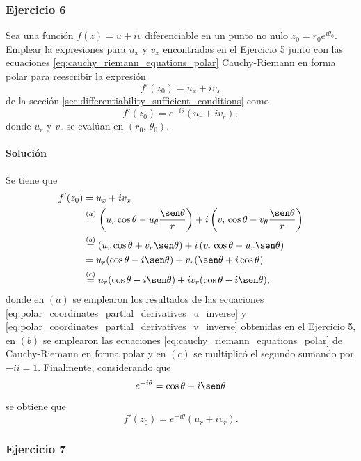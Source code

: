 \documentclass[a4paper]{report}
\begin{document}
\subsubsection{Ejercicio 6}

Sea una función \(f(z)=u+iv\) diferenciable en un punto no nulo \(z_0=r_0e^{i\theta_0}\). Emplear la expresiones para \(u_x\) y \(v_x\) encontradas en el Ejercicio 5 junto con las ecuaciones \ref{eq:cauchy_riemann_equations_polar} Cauchy-Riemann en forma polar para reescribir la expresión 
\[
 f'(z_0)=u_x+iv_x
\]
de la sección \ref{sec:differentiability_sufficient_conditions} como
\begin{equation}\label{eq:cauchy_riemann_f_derivative_polar}
 f'(z_0)=e^{-i\theta}(u_r+iv_r),
\end{equation}
donde \(u_r\) y \(v_r\) se evalúan en \((r_0,\,\theta_0)\).

\paragraph{Solución} Se tiene que 
\begin{align}
 f'(z_0)&=u_x+iv_x\nonumber\\
  &\overset{(a)}{=}\left(u_r\cos\theta-u_\theta\frac{\sen\theta}{r}\right)+i\left(v_r\cos\theta-v_\theta\frac{\sen\theta}{r}\right)\label{eq:exercise_24_06_f_derivative}\\
  &\overset{(b)}{=}\left(u_r\cos\theta+v_r\sen\theta\right)+i\left(v_r\cos\theta-u_r\sen\theta\right)\nonumber\\
  &=u_r(\cos\theta-i\sen\theta)+v_r(\sen\theta+i\cos\theta)\nonumber\\
  &\overset{(c)}{=}u_r(\cos\theta-i\sen\theta)+iv_r(\cos\theta-i\sen\theta),\nonumber
\end{align}
donde en \((a)\) se emplearon los resultados de las ecuaciones \ref{eq:polar_coordinates_partial_derivatives_u_inverse} y \ref{eq:polar_coordinates_partial_derivatives_v_inverse} obtenidas en el Ejercicio 5, en \((b)\) se emplearon las ecuaciones \ref{eq:cauchy_riemann_equations_polar} de Cauchy-Riemann en forma polar y en \((c)\) se multiplicó el segundo sumando por \(-ii=1\). Finalmente, considerando que 
\[
 e^{-i\theta}=\cos\theta-i\sen\theta
\]
se obtiene que 
\[
 f'(z_0)=e^{-i\theta}(u_r+iv_r).
\]

\subsubsection{Ejercicio 7}
\end{document}
